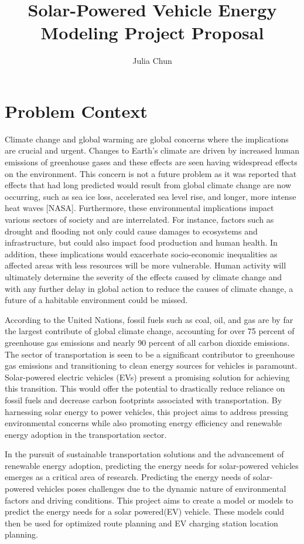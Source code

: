 \documentclass[10pt,twocolumn]{article}
\title{Solar-Powered Vehicle Energy Modeling Project Proposal}
\author{Julia Chun}
\affiliation{Occidental College}
\begin{document}
\maketitle

\section{Problem Context}


Climate change and global warming are global concerns where the implications are crucial and urgent. Changes to Earth's climate are driven by increased human emissions of greenhouse gases and these effects are seen having widespread effects on the environment. This concern is not a future problem as it was reported that effects that had long predicted would result from global climate change are now occurring, such as sea ice loss, accelerated sea level rise, and longer, more intense heat waves [NASA]. Furthermore, these environmental implications impact various sectors of society and are interrelated. For instance, factors such as drought and flooding not only could cause damages to ecosystems and infrastructure, but could also impact food production and human health. In addition, these implications would exacerbate socio-economic inequalities as affected areas with less resources will be more vulnerable. Human activity will ultimately determine the severity of the effects caused by climate change and with any further delay in global action to reduce the causes of climate change, a future of a habitable environment could be missed. 

According to the United Nations, fossil fuels such as coal, oil, and gas are by far the largest contribute of global climate change, accounting for over 75 percent of greenhouse gas emissions and nearly 90 percent of all carbon dioxide emissions. The sector of transportation is seen to be a significant contributor to greenhouse gas emissions and transitioning to clean energy sources for vehicles is paramount. Solar-powered electric vehicles (EVs) present a promising solution for achieving this transition. This would offer the potential to drastically reduce reliance on fossil fuels and decrease carbon footprints associated with transportation. By harnessing solar energy to power vehicles, this project aims to address pressing environmental concerns while also promoting energy efficiency and renewable energy adoption in the transportation sector.

In the pursuit of sustainable transportation solutions and the advancement of renewable energy adoption, predicting the energy needs for solar-powered vehicles emerges as a critical area of research. Predicting the energy needs of solar-powered vehicles poses challenges due to the dynamic nature of environmental factors and driving conditions. This project aims to create a model or models to predict the energy needs for a solar powered(EV) vehicle. 
These models could then be used for optimized route planning and EV charging station location planning.
\end{document}
